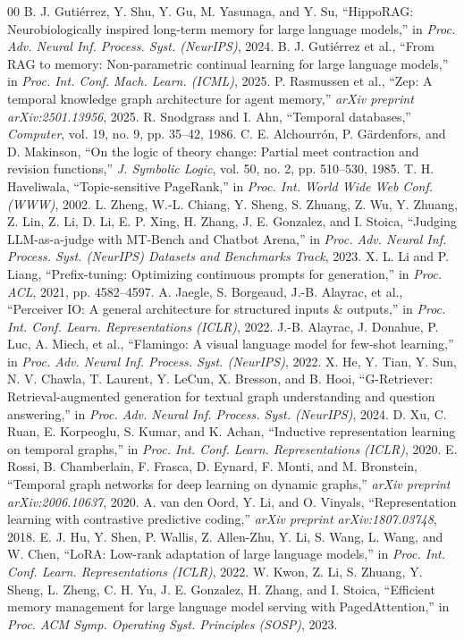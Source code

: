 \documentclass[conference]{IEEEtran}
\begin{document}
\begin{thebibliography}{00}
 B. J. Guti{\'e}rrez, Y. Shu, Y. Gu, M. Yasunaga, and Y. Su, ``HippoRAG: Neurobiologically inspired long-term memory for large language models,'' in \textit{Proc. Adv. Neural Inf. Process. Syst. (NeurIPS)}, 2024.
 B. J. Guti{\'e}rrez et al., ``From RAG to memory: Non-parametric continual learning for large language models,'' in \textit{Proc. Int. Conf. Mach. Learn. (ICML)}, 2025.
 P. Rasmussen et al., ``Zep: A temporal knowledge graph architecture for agent memory,'' \textit{arXiv preprint arXiv:2501.13956}, 2025.
 R. Snodgrass and I. Ahn, ``Temporal databases,'' \textit{Computer}, vol. 19, no. 9, pp. 35--42, 1986.
 C. E. Alchourr{\'o}n, P. G{\"a}rdenfors, and D. Makinson, ``On the logic of theory change: Partial meet contraction and revision functions,'' \textit{J. Symbolic Logic}, vol. 50, no. 2, pp. 510--530, 1985.
 T. H. Haveliwala, ``Topic-sensitive PageRank,'' in \textit{Proc. Int. World Wide Web Conf. (WWW)}, 2002.
 L. Zheng, W.-L. Chiang, Y. Sheng, S. Zhuang, Z. Wu, Y. Zhuang, Z. Lin, Z. Li, D. Li, E. P. Xing, H. Zhang, J. E. Gonzalez, and I. Stoica, ``Judging LLM-as-a-judge with MT-Bench and Chatbot Arena,'' in \textit{Proc. Adv. Neural Inf. Process. Syst. (NeurIPS) Datasets and Benchmarks Track}, 2023.
 X. L. Li and P. Liang, ``Prefix-tuning: Optimizing continuous prompts for generation,'' in \textit{Proc. ACL}, 2021, pp. 4582--4597.
 A. Jaegle, S. Borgeaud, J.-B. Alayrac, et al., ``Perceiver IO: A general architecture for structured inputs \& outputs,'' in \textit{Proc. Int. Conf. Learn. Representations (ICLR)}, 2022.
 J.-B. Alayrac, J. Donahue, P. Luc, A. Miech, et al., ``Flamingo: A visual language model for few-shot learning,'' in \textit{Proc. Adv. Neural Inf. Process. Syst. (NeurIPS)}, 2022.
 X. He, Y. Tian, Y. Sun, N. V. Chawla, T. Laurent, Y. LeCun, X. Bresson, and B. Hooi, ``G-Retriever: Retrieval-augmented generation for textual graph understanding and question answering,'' in \textit{Proc. Adv. Neural Inf. Process. Syst. (NeurIPS)}, 2024.
 D. Xu, C. Ruan, E. Korpeoglu, S. Kumar, and K. Achan, ``Inductive representation learning on temporal graphs,'' in \textit{Proc. Int. Conf. Learn. Representations (ICLR)}, 2020.
 E. Rossi, B. Chamberlain, F. Frasca, D. Eynard, F. Monti, and M. Bronstein, ``Temporal graph networks for deep learning on dynamic graphs,'' \textit{arXiv preprint arXiv:2006.10637}, 2020.
 A. van den Oord, Y. Li, and O. Vinyals, ``Representation learning with contrastive predictive coding,'' \textit{arXiv preprint arXiv:1807.03748}, 2018.
 E. J. Hu, Y. Shen, P. Wallis, Z. Allen-Zhu, Y. Li, S. Wang, L. Wang, and W. Chen, ``LoRA: Low-rank adaptation of large language models,'' in \textit{Proc. Int. Conf. Learn. Representations (ICLR)}, 2022.
 W. Kwon, Z. Li, S. Zhuang, Y. Sheng, L. Zheng, C. H. Yu, J. E. Gonzalez, H. Zhang, and I. Stoica, ``Efficient memory management for large language model serving with PagedAttention,'' in \textit{Proc. ACM Symp. Operating Syst. Principles (SOSP)}, 2023.
\end{thebibliography}
\end{document}
